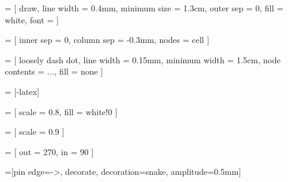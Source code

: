 \newcommand{\true}{\textcolor{green}{\ding{51}}}
\newcommand{\false}{\textcolor{red}{\ding{55}}}

 = [
  draw,
  line width = 0.4mm,
  minimum size = 1.3cm,
  outer sep = 0,
  fill = white,
  font = \large
]

 = [
  inner sep = 0,
  column sep = -0.3mm,
  nodes = cell
]

 = [
  loosely dash dot,
  line width = 0.15mm,
  minimum width = 1.5cm,
  node contents = $\ldots$,
  fill = none
]

\newcommand{\ellipsis}{ \node [ellipsis]; }

 = [-latex]

 = [
  scale = 0.8,
  fill = white!0
]

 = [
  scale = 0.9
]

 = [
  out = 270,
  in = 90
]

=[pin edge={->, decorate, decoration={snake, amplitude=0.5mm}}]
